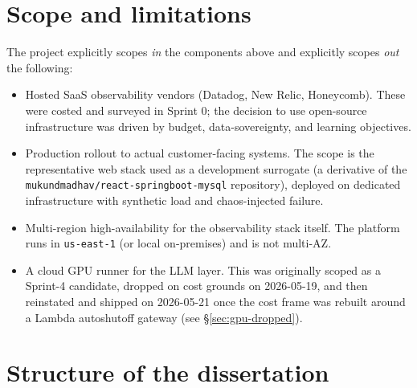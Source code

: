 \documentclass[11pt,a4paper,oneside]{report}
\begin{document}
\section{Scope and limitations}

The project explicitly scopes \emph{in} the components above and
explicitly scopes \emph{out} the following:

\begin{itemize}
  \item Hosted SaaS observability vendors (Datadog, New Relic,
        Honeycomb).  These were costed and surveyed in Sprint 0; the
        decision to use open-source infrastructure was driven by
        budget, data-sovereignty, and learning objectives.
  \item Production rollout to actual customer-facing systems.  The
        scope is the representative web stack used as a development
        surrogate (a derivative of the
        \texttt{mukundmadhav/react-springboot-mysql} repository),
        deployed on dedicated infrastructure with synthetic load and
        chaos-injected failure.
  \item Multi-region high-availability for the observability stack
        itself.  The platform runs in \texttt{us-east-1} (or local
        on-premises) and is not multi-AZ.
  \item A cloud GPU runner for the LLM layer.  This was originally
        scoped as a Sprint-4 candidate, dropped on cost grounds
        on 2026-05-19, and then reinstated and shipped on
        2026-05-21 once the cost frame was rebuilt around a
        Lambda autoshutoff gateway (see
        \S\ref{sec:gpu-dropped}).
\end{itemize}

\section{Structure of the dissertation}
\end{document}
